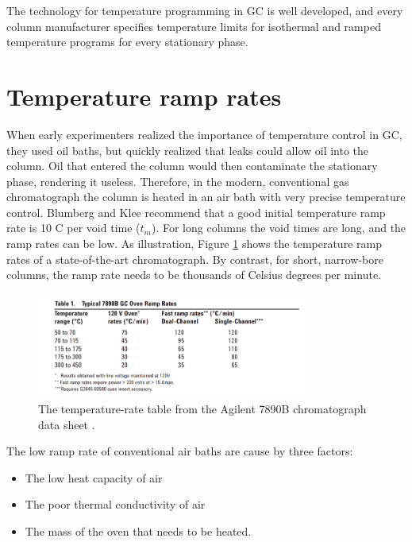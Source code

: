 The technology for temperature programming in GC is well developed, and every
column manufacturer specifies temperature limits for isothermal and ramped
temperature programs for every stationary phase.

\section{Temperature ramp rates}
\label{sec:RampRates}
When early experimenters realized the importance of temperature control in GC,
they used oil baths, but quickly realized that leaks
could allow oil into the column. Oil that entered the column would then
contaminate the stationary phase, rendering it useless. Therefore, in the
modern, conventional gas chromatograph the column is heated in an air bath with
very precise temperature control.
Blumberg and Klee \autocite{Blumberg2000} recommend that a good initial
temperature ramp rate is 10 C\textdegree{} per void time ($t_m$). For long
columns the void times are long, and the ramp rates can be low. As illustration,
Figure \ref{fig:RampRate7890B} shows the temperature ramp rates of a
state-of-the-art chromatograph. By contrast, for short, narrow-bore columns, the
ramp rate needs to be thousands of Celsius degrees per minute.

\begin{figure}
	\centering
	\includegraphics[width=0.8\textwidth]{Figures/7890B.png}
	\decoRule
	\caption[A temperature-rate table from the Agilent7890B data sheet]{The
	temperature-rate table from the Agilent 7890B chromatograph data sheet
	\autocite{7890B}. }
	\label{fig:RampRate7890B}
\end{figure}

The low ramp rate of conventional air baths are cause by three factors:

\begin{itemize}
	\item The low heat capacity of air
	\item The poor thermal conductivity of air
	\item The mass of the oven that needs to be heated. 
\end{itemize}

